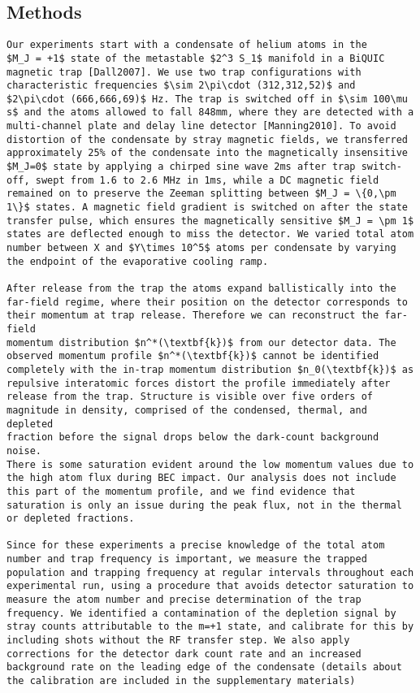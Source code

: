 \hypertarget{methods}{%
\subsection{Methods}\label{methods}}

\begin{verbatim}
Our experiments start with a condensate of helium atoms in the
$M_J = +1$ state of the metastable $2^3 S_1$ manifold in a BiQUIC
magnetic trap [Dall2007]. We use two trap configurations with characteristic frequencies $\sim 2\pi\cdot (312,312,52)$ and $2\pi\cdot (666,666,69)$ Hz. The trap is switched off in $\sim 100\mu s$ and the atoms allowed to fall 848mm, where they are detected with a
multi-channel plate and delay line detector [Manning2010]. To avoid distortion of the condensate by stray magnetic fields, we transferred approximately 25% of the condensate into the magnetically insensitive $M_J=0$ state by applying a chirped sine wave 2ms after trap switch-off, swept from 1.6 to 2.6 MHz in 1ms, while a DC magnetic field remained on to preserve the Zeeman splitting between $M_J = \{0,\pm 1\}$ states. A magnetic field gradient is switched on after the state transfer pulse, which ensures the magnetically sensitive $M_J = \pm 1$ states are deflected enough to miss the detector. We varied total atom number between X and $Y\times 10^5$ atoms per condensate by varying the endpoint of the evaporative cooling ramp. 

After release from the trap the atoms expand ballistically into the
far-field regime, where their position on the detector corresponds to
their momentum at trap release. Therefore we can reconstruct the far-field
momentum distribution $n^*(\textbf{k})$ from our detector data. The
observed momentum profile $n^*(\textbf{k})$ cannot be identified
completely with the in-trap momentum distribution $n_0(\textbf{k})$ as
repulsive interatomic forces distort the profile immediately after
release from the trap. Structure is visible over five orders of
magnitude in density, comprised of the condensed, thermal, and depleted
fraction before the signal drops below the dark-count background noise.
There is some saturation evident around the low momentum values due to
the high atom flux during BEC impact. Our analysis does not include this part of the momentum profile, and we find evidence that saturation is only an issue during the peak flux, not in the thermal or depleted fractions.

Since for these experiments a precise knowledge of the total atom number and trap frequency is important, we measure the trapped population and trapping frequency at regular intervals throughout each experimental run, using a procedure that avoids detector saturation to measure the atom number and precise determination of the trap frequency. We identified a contamination of the depletion signal by stray counts attributable to the m=+1 state, and calibrate for this by including shots without the RF transfer step. We also apply corrections for the detector dark count rate and an increased background rate on the leading edge of the condensate (details about the calibration are included in the supplementary materials)


\end{verbatim}
